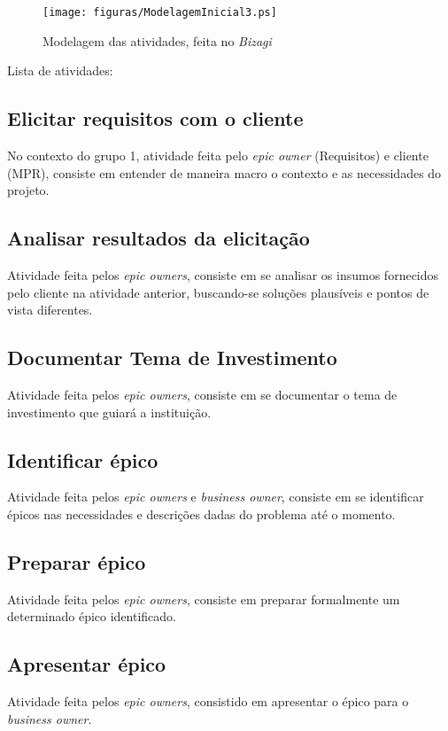 \begin{figure}[h]
  \centering
  \caption{Modelagem das atividades, feita no \emph{Bizagi}}
  \texttt{[image: figuras/ModelagemInicial3.ps]}
\end{figure}

Lista de atividades:
\subsection{Elicitar requisitos com o cliente}
No contexto do grupo 1, atividade feita pelo \emph{epic owner} (Requisitos) e cliente (MPR), consiste em entender de maneira macro o contexto e as necessidades do projeto.

\subsection{Analisar resultados da elicitação}
Atividade feita pelos \emph{epic owners}, consiste em se analisar os insumos fornecidos pelo cliente na atividade anterior, buscando-se soluções plausíveis e pontos de vista diferentes.

\subsection{Documentar Tema de Investimento}
Atividade feita pelos \emph{epic owners}, consiste em se documentar o tema de investimento que guiará a instituição.

\subsection{Identificar épico}
Atividade feita pelos \emph{epic owners} e \emph{business owner}, consiste em se identificar épicos nas necessidades e descrições dadas do problema até o momento.

\subsection{Preparar épico}
Atividade feita pelos \emph{epic owners}, consiste em preparar formalmente um determinado épico identificado.

\subsection{Apresentar épico}
Atividade feita pelos \emph{epic owners}, consistido em apresentar o épico para o \emph{business owner}.

